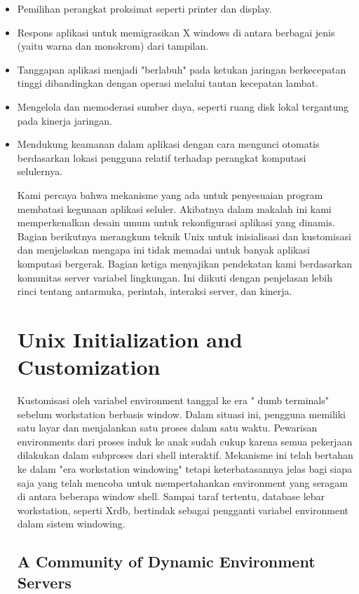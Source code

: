 \begin{itemize}
\item Pemilihan perangkat proksimat seperti printer dan display.
\item Respons aplikasi untuk memigrasikan X windows di antara berbagai jenis (yaitu warna dan monokrom) dari tampilan.
\item Tanggapan aplikasi menjadi "berlabuh" pada ketukan jaringan berkecepatan tinggi dibandingkan dengan operasi melalui tautan kecepatan lambat.
\item Mengelola dan memoderasi sumber daya, seperti ruang disk lokal tergantung pada kinerja jaringan.
\item Mendukung keamanan dalam aplikasi dengan cara mengunci otomatis berdasarkan lokasi pengguna relatif terhadap perangkat komputasi selulernya.

Kami percaya bahwa mekanisme yang ada untuk penyesuaian program membatasi kegunaan aplikasi seluler. Akibatnya dalam makalah ini kami memperkenalkan desain umum untuk rekonfigurasi aplikasi yang dinamis. Bagian berikutnya merangkum teknik Unix untuk inisialisasi dan kustomisasi dan menjelaskan mengapa ini tidak memadai untuk banyak aplikasi komputasi bergerak. Bagian ketiga menyajikan pendekatan kami berdasarkan komunitas server variabel lingkungan. Ini diikuti dengan penjelasan lebih rinci tentang antarmuka, perintah, interaksi server, dan kinerja.



\section {Unix Initialization and Customization}

Kustomisasi oleh variabel environment tanggal ke era " dumb terminals" sebelum workstation berbasis window. Dalam situasi ini, pengguna memiliki satu layar dan menjalankan satu proses dalam satu waktu. Pewarisan environments dari proses induk ke anak sudah cukup karena semua pekerjaan dilakukan dalam subproses dari shell interaktif. Mekanisme ini telah bertahan ke dalam "era workstation windowing" tetapi keterbatasannya jelas bagi siapa saja yang telah mencoba untuk mempertahankan environment yang seragam di antara beberapa window shell. Sampai taraf tertentu, database lebar workstation, seperti Xrdb, bertindak sebagai pengganti variabel environment dalam sistem windowing. \cite{schilit1993customizing}

\subsection {A Community of Dynamic Environment Servers}


\end{itemize}
